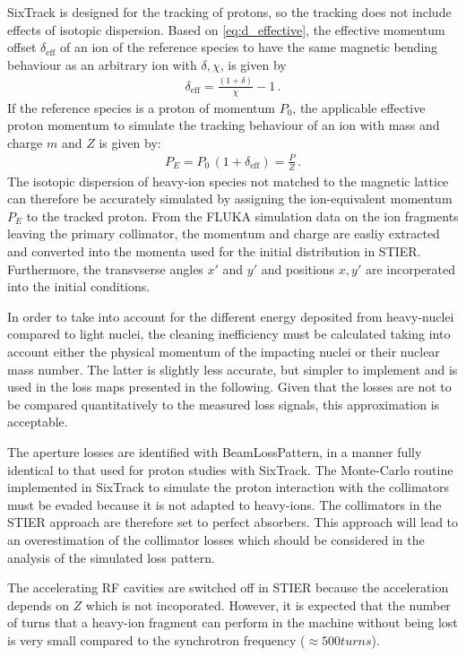 SixTrack is designed for the tracking of protons, so the tracking does not include effects of isotopic dispersion. Based on \eqref{eq:d_effective}, the effective momentum offset $\delta_\text{eff}$ of an ion of the reference species to have the same magnetic bending behaviour as an arbitrary ion with $\delta,\chi$, is given by
%
\begin{align}
\delta_\text{eff} = \frac{(1+\delta)}{\chi} -1 \,. 
\end{align}
%
If the reference species is a proton of momentum $P_0$, the applicable effective proton momentum to simulate the tracking behaviour of an ion with mass and charge $m$ and $Z$ is given by:
\begin{align}
  P_E = P_0 \, (1+\delta_\text{eff}) = \frac{P}{Z} \, .
\end{align}
%
The isotopic dispersion of heavy-ion species not matched to the magnetic lattice can therefore be accurately simulated by assigning the ion-equivalent momentum $P_E$ to the tracked proton. From the FLUKA simulation data on the ion fragments leaving the primary collimator, the momentum and charge are easliy extracted and converted into the momenta used for the initial distribution in STIER. Furthermore, the transvserse angles $x'$ and $y'$ and positions $x,y'$ are incorperated into the initial conditions. 

In order to take into account for the different energy deposited from heavy-nuclei compared to light nuclei, the cleaning inefficiency must be calculated taking into account either the physical momentum of the impacting nuclei or their nuclear mass number. The latter is slightly less accurate, but simpler to implement and is used in the loss maps presented in the following. Given that the losses are not to be compared quantitatively to the measured loss signals, this approximation is acceptable. 

The aperture losses are identified with BeamLossPattern, in a manner fully identical to that used for proton studies with SixTrack. The Monte-Carlo routine implemented in SixTrack to simulate the proton interaction with the collimators must be evaded because it is not adapted to heavy-ions. The collimators in the STIER approach are therefore set to perfect absorbers. This approach will lead to an overestimation of the collimator losses which should be considered in the analysis of the simulated loss pattern. 

The accelerating RF cavities are switched off in STIER because the acceleration depends on $Z$ which is not incoporated. However, it is expected that the number of turns that a heavy-ion fragment can perform in the machine without being lost is very small compared to the synchrotron frequency ($\approx 500 turns$). 



